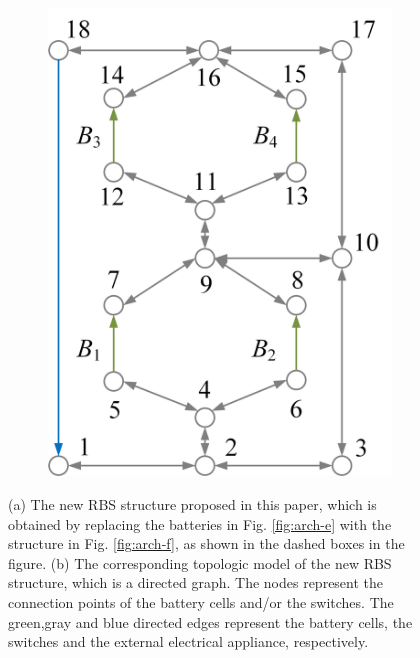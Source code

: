\documentclass{article}
\begin{document}
\begin{figure}[htbp]
\begin{subfigure}[b]{0.45\textwidth}
        \includegraphics[width=\textwidth]{../attachments/ef-topo.png}
        \caption{}
        \label{fig:ef-topo}
    \end{subfigure}
    \caption{
        (a) The new RBS structure proposed in this paper, which is obtained by replacing the batteries in Fig. \ref{fig:arch-e} with the structure in Fig. \ref{fig:arch-f}, as shown in the dashed boxes in the figure.
        (b) The corresponding topologic model of the new RBS structure, which is a directed graph.
        The nodes represent the connection points of the battery cells and/or the switches.
        The green,gray and blue directed edges represent the battery cells, the switches and the external electrical appliance, respectively.
    }
\end{figure}
\end{document}
